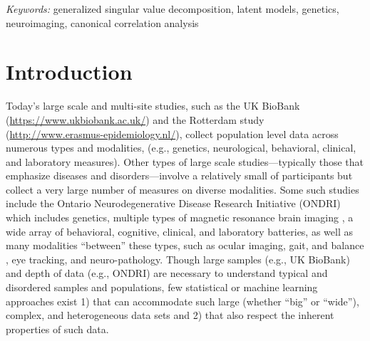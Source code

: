 \documentclass[12pt]{article}
\begin{document}
\noindent%
{\it Keywords:} generalized singular value decomposition, latent models, genetics, neuroimaging, canonical correlation analysis
\vfill

\newpage
{} %

\hypertarget{introduction}{%
\section{Introduction}\label{introduction}}

\label{section:Intro}

Today's large scale and multi-site studies, such as the UK BioBank
(\url{https://www.ukbiobank.ac.uk/}) and the Rotterdam study
(\url{http://www.erasmus-epidemiology.nl/}), collect population level
data across numerous types and modalities, (e.g., genetics,
neurological, behavioral, clinical, and laboratory measures). Other
types of large scale studies---typically those that emphasize diseases
and disorders---involve a relatively small of participants but collect a
very large number of measures on diverse modalities. Some such studies
include the Ontario Neurodegenerative Disease Research Initiative
(ONDRI) \citep{farhan_ontario_2016} which includes genetics, multiple
types of magnetic resonance brain imaging
\citep{duchesne_canadian_2019}, a wide array of behavioral, cognitive,
clinical, and laboratory batteries, as well as many modalities
``between'' these types, such as ocular imaging, gait, and balance
\citep{montero-odasso_motor_2017-1}, eye tracking, and neuro-pathology.
Though large samples (e.g., UK BioBank) and depth of data (e.g., ONDRI)
are necessary to understand typical and disordered samples and
populations, few statistical or machine learning approaches exist 1)
that can accommodate such large (whether ``big'' or ``wide''), complex,
and heterogeneous data sets and 2) that also respect the inherent
properties of such data.
\end{document}
